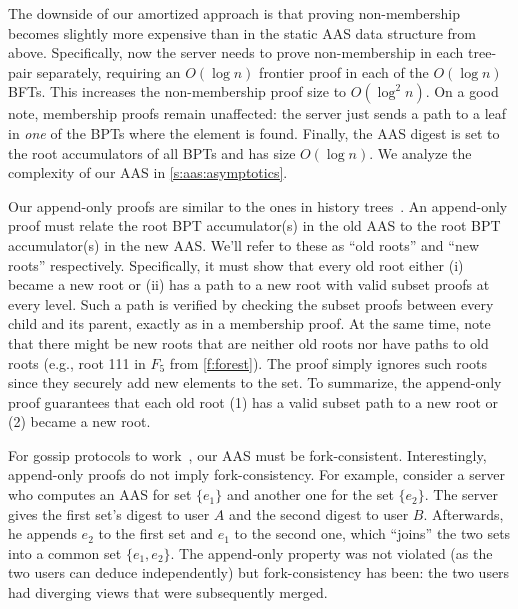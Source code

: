 The downside of our amortized approach is that proving non-membership becomes slightly more expensive than in the static AAS data structure from above.
Specifically, now the server needs to prove non-membership in each tree-pair separately, requiring an $O(\log{n})$ frontier proof in each of the $O(\log{n})$ BFTs.
This increases the non-membership proof size to $O(\log^2 n)$.
On a good note, membership proofs remain unaffected: the server just sends a path to a leaf in \textit{one} of the BPTs where the element is found.
Finally, the AAS digest is set to the root accumulators of all BPTs and has size $O(\log{n})$.
We analyze the complexity of our AAS in \cref{s:aas:asymptotics}.

Our append-only proofs are similar to the ones in history trees~\cite{ht}.
An append-only proof must relate the root BPT accumulator(s) in the old AAS to the root BPT accumulator(s) in the new AAS.
We'll refer to these as ``old roots'' and ``new roots'' respectively.
Specifically, it must show that every old root either (i) became a new root or (ii) has a path to a new root with valid subset proofs at every level.
Such a path is verified by checking the subset proofs between every child and its parent, exactly as in a membership proof.
At the same time, note that there might be new roots that are neither old roots nor have paths to old roots (e.g., root 111 in $F_5$ from \cref{f:forest}).
The proof simply ignores such roots since they securely add new elements to the set.
To summarize, the append-only proof guarantees that each old root (1) has a valid subset path to a new root or (2) became a new root.

For gossip protocols to work~\cite{ct-gossip,DahlbergPullsVestin2018}, our AAS must be fork-consistent.
Interestingly, append-only proofs do not imply fork-consistency.
For example, consider a server who computes an AAS for set $\{e_1\}$ and another one for the set $\{e_2\}$. 
The server gives the first set's digest to user $A$ and the second digest to user $B$.
Afterwards, he appends $e_2$ to the first set and $e_1$ to the second one, which ``joins'' the two sets into a common set $\{e_1,e_2\}$.
The append-only property was not violated (as the two users can deduce independently) but fork-consistency has been: the two users had diverging views that were subsequently merged.

